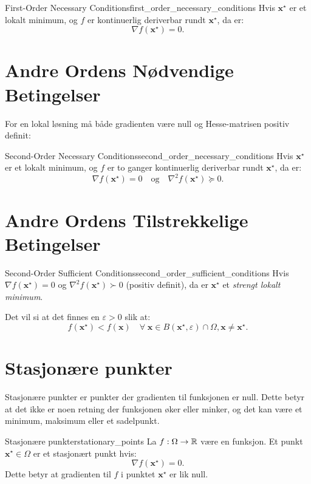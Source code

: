 \begin{theorem}{First-Order Necessary Conditions}{first_order_necessary_conditions}
	Hvis \(\mathbf{x}^\star\) er et lokalt minimum, og \(f\) er kontinuerlig deriverbar rundt \(\mathbf{x}^\star\), da er:
	\[
		\nabla f(\mathbf{x}^\star) = 0.
	\]
\end{theorem}

\section{Andre Ordens Nødvendige Betingelser}

For en lokal løsning må både gradienten være null og Hesse-matrisen positiv definit:

\begin{theorem}{Second-Order Necessary Conditions}{second_order_necessary_conditions}
	Hvis \(\mathbf{x}^\star\) er et lokalt minimum, og \(f\) er to ganger kontinuerlig deriverbar rundt \(\mathbf{x}^\star\), da er:
	\[
		\nabla f(\mathbf{x}^\star) = 0 \quad \text{og} \quad \nabla^2 f(\mathbf{x}^\star) \succeq 0.
	\]
\end{theorem}

\section{Andre Ordens Tilstrekkelige Betingelser}

\begin{theorem}{Second-Order Sufficient Conditions}{second_order_sufficient_conditions}
	Hvis \(\nabla f(\mathbf{x}^\star) = 0\) og \(\nabla^2 f(\mathbf{x}^\star) \succ 0\) (positiv definit), da er \(\mathbf{x}^\star\) et \emph{strengt lokalt minimum}.

	\medskip

	Det vil si at det finnes en \(\varepsilon > 0\) slik at:
	\[
		f(\mathbf{x}^\star) < f(\mathbf{x})  \quad \forall \; \mathbf{x} \in B(\mathbf{x}^\star, \varepsilon) \cap \Omega, \mathbf{x} \neq \mathbf{x}^\star.
	\]
\end{theorem}

\section{Stasjonære punkter}
Stasjonære punkter er punkter der gradienten til funksjonen er null. Dette betyr at det ikke er noen retning der funksjonen øker eller minker, og det kan være et minimum, maksimum eller et sadelpunkt.

\begin{definition}{Stasjonære punkter}{stationary_points}
	La \(f: \Omega \to \mathbb{R}\) være en funksjon. Et punkt \(\symbf{x}^\star \in \Omega\) er et stasjonært punkt hvis:
	\[
		\nabla f(\symbf{x}^\star) = 0.
	\]
	Dette betyr at gradienten til \(f\) i punktet \(\symbf{x}^\star\) er lik null.
\end{definition}

